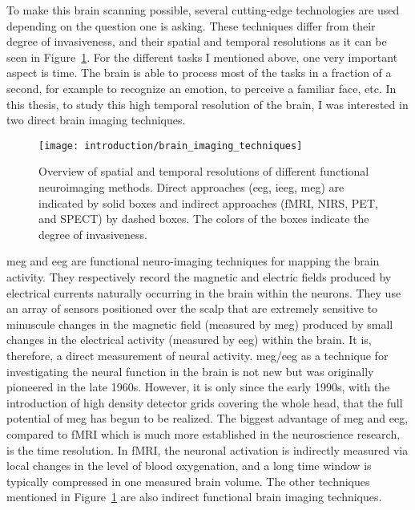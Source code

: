 To make this brain scanning possible, several cutting-edge technologies are used  depending on the question one is asking. These techniques differ from their degree of invasiveness, and their spatial and temporal resolutions as it can be seen in Figure~\ref{fig:brain_imaging_techniques}.
For the different tasks I mentioned above, one very important aspect is time. The brain is able to process most of the tasks in a fraction of a second, for example to recognize an emotion, to perceive a familiar face, etc. In this thesis, to study this high temporal resolution of the brain, I was interested in two direct brain imaging techniques.

\begin{figure}
	\texttt{[image: introduction/brain\_imaging\_techniques]}
    \caption{Overview of spatial and temporal resolutions of different functional neuroimaging methods. Direct approaches (\ac{eeg}, i\ac{eeg}, \ac{meg}) are indicated by solid boxes and indirect approaches (\ac{fMRI}, \ac{NIRS}, \ac{PET}, and \ac{SPECT}) by dashed boxes. The colors of the boxes indicate the degree of invasiveness.
    }
    \label{fig:brain_imaging_techniques}
\end{figure}
 
\Ac{meg} and \ac{eeg} are functional neuro-imaging techniques for mapping the brain activity. They respectively record the magnetic and electric fields produced by electrical currents naturally occurring in the brain within the neurons. They use an array of sensors positioned over the scalp that are extremely sensitive to minuscule changes in the magnetic field (measured by \ac{meg}) produced by small changes in the electrical activity (measured by \ac{eeg}) within the brain. It is, therefore, a direct measurement of neural activity. \ac{meg}/\ac{eeg} as a technique for investigating the neural function in the brain is not new but was originally pioneered in the late 1960s. However, it is only since the early 1990s, with the introduction of high density detector grids covering the whole head, that the full potential of \ac{meg} has begun to be realized. The biggest advantage of \ac{meg} and \ac{eeg}, compared to \ac{fMRI} which is much more established in the neuroscience research, is the time resolution. In fMRI, the neuronal activation is indirectly measured via local changes in the level of blood oxygenation, and a long time window is typically compressed in one measured brain volume. The other techniques mentioned in Figure~\ref{fig:brain_imaging_techniques} are also indirect functional brain imaging techniques.\\

